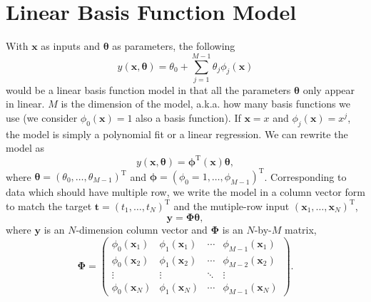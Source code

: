 \section{Linear Basis Function Model}
With $\mathbf{x}$ as inputs and $\boldsymbol{\theta}$ as parameters, the following
\begin{equation}
y(\mathbf{x}, \boldsymbol{\theta}) = \theta_0 +\sum_{j=1}^{M-1}{\theta_j\phi_j(\mathbf{x})}
\end{equation}
would be a linear basis function model in that all the parameters $\boldsymbol{\theta}$ only appear in linear. $M$ is the dimension of the model, a.k.a. how many basis functions we use (we consider $\phi_0(\mathbf{x})=1$ also a basis function). If $\mathbf{x} = x$ and $\phi_j(\mathbf{x})=x^j$, the model is simply a polynomial fit or a linear regression. We can rewrite the model as
\begin{equation}
y(\mathbf{x}, \boldsymbol{\theta})=\boldsymbol{\phi}^\mathrm{T}(\mathbf{x})\boldsymbol{\theta},
\end{equation}
where $\boldsymbol{\theta} = (\theta_0,\ldots,\theta_{M-1})^\mathrm{T}$ and $\boldsymbol{\phi} = (\phi_0=1,\ldots,\phi_{M-1})^\mathrm{T}$. Corresponding to data which should have multiple row, we write the model in a column vector form to match the target $\mathbf{t}=(t_1,\ldots,t_N)^\mathrm{T}$ and the mutiple-row input $(\mathbf{x}_1,\ldots,\mathbf{x}_N)^\mathrm{T}$,
\begin{equation}
\mathbf{y}=\mathbf{\Phi}\boldsymbol{\theta},
\end{equation}
where $\mathbf{y}$ is an $N$-dimension column vector and $\mathbf{\Phi}$ is an $N$-by-$M$ matrix,
\begin{equation}
\mathbf{\Phi}=\left(
\begin{array}{cccc}
\phi_0(\mathbf{x}_1) & \phi_1(\mathbf{x}_1) & \cdots & \phi_{M-1}(\mathbf{x}_1) \\
\phi_0(\mathbf{x}_2) & \phi_1(\mathbf{x}_2) & \cdots & \phi_{M-2}(\mathbf{x}_2) \\
\vdots & \vdots & \ddots & \vdots \\
\phi_0(\mathbf{x}_N) & \phi_1(\mathbf{x}_N) & \cdots & \phi_{M-1}(\mathbf{x}_N)
\end{array} \right).
\end{equation}

